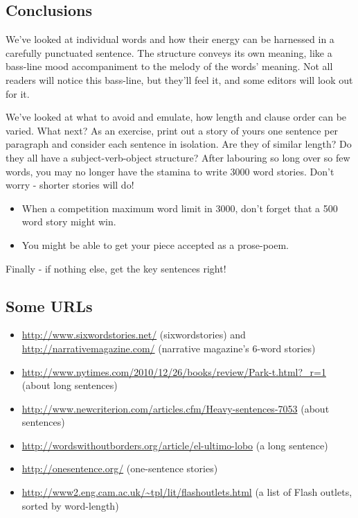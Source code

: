 \documentclass[11pt]{article}
\begin{document}
\subsection*{Conclusions}
We've looked at individual words and how their energy can be harnessed in a carefully punctuated sentence. The structure conveys its own meaning, like a bass-line mood accompaniment to the melody of the words' meaning. Not all readers will notice this bass-line, but they'll feel it, and some editors will look out for it.




We've looked at what to avoid and emulate, how length and clause order can be varied. What next?  As an exercise, print out a story of yours one sentence per paragraph and consider each sentence in isolation. Are they of similar length? Do they all have a subject-verb-object structure? After labouring so long over so few words, you may no longer have the stamina to write 3000 word stories. Don't worry - shorter stories will do!



\begin{itemize}
\item  When a competition maximum word limit in 3000, don't forget that a 500 word story might win.
\item  You might be able to get your piece accepted as a prose-poem. 
\end{itemize}
Finally - if nothing else, get the key sentences right!




\subsection*{Some URLs}
\begin{itemize}
\item  \url{http://www.sixwordstories.net/} (sixwordstories) and  \url{http://narrativemagazine.com/} (narrative magazine's 6-word stories)
\item  \url{http://www.nytimes.com/2010/12/26/books/review/Park-t.html?_r=1} (about long sentences)
\item  \url{http://www.newcriterion.com/articles.cfm/Heavy-sentences-7053} (about sentences)
\item  \url{http://wordswithoutborders.org/article/el-ultimo-lobo} (a long sentence)
\item  \url{http://onesentence.org/} (one-sentence stories)
\item  \url{http://www2.eng.cam.ac.uk/~tpl/lit/flashoutlets.html} (a list of Flash outlets, sorted by word-length)
\end{itemize}
\end{document}
